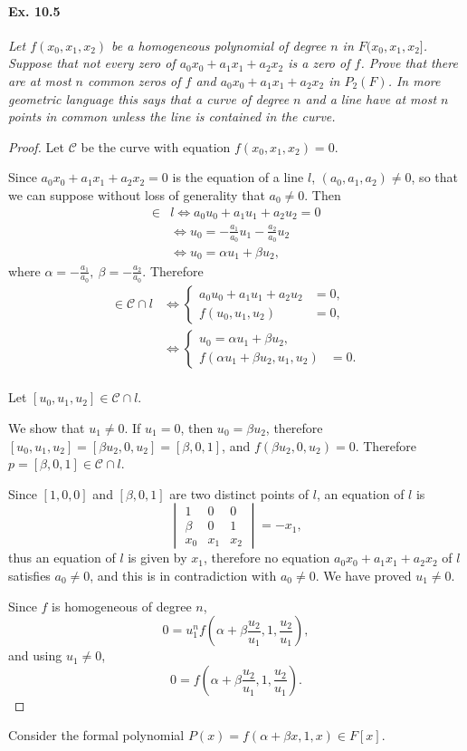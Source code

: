 \documentclass[11pt,a4paper]{article}
\begin{document}
\paragraph{Ex. 10.5} {\it Let $f(x_0,x_1,x_2)$ be a homogeneous polynomial of degree $n$ in $F(x_0,x_1,x_2]$. Suppose that not every zero of $a_0x_0+a_1x_1+a_2x_2$ is a zero of $f$. Prove that there are at most $n$ common zeros of $f$ and $a_0x_0+a_1x_1+a_2x_2$ in $P_2(F)$. In more geometric language this says that a curve of degree $n$ and a line have at most $n$ points in common unless the line is contained in the curve.
}
\begin{proof}
Let $\mathscr{C}$ be the curve with equation $f(x_0,x_1,x_2) = 0$.

Since $a_0 x_0+a_1x_1+a_2x_2 =0$ is the equation of a line $l$, $(a_0,a_1,a_2) \ne 0$, so that we can suppose without loss of generality that $a_0 \ne 0$. Then 
\begin{align*}
[u_0,u_1,u_2] \in &l \iff a_0 u_0+a_1u_1+a_2u_2 =0\\
& \iff u_0 = -\frac{a_1}{a_0} u_1 - \frac{a_2}{a_0} u_2\\
&\iff u_0 = \alpha u_1 + \beta u_2,
\end{align*}
where $\alpha = -\frac{a_1}{a_0},\ \beta = - \frac{a_2}{a_0}.$
Therefore
\begin{align*}
[u_0,u_1,u_2] \in \mathscr{C} \cap l &\iff 
\left\{
\begin{array}{ll}
  a_0 u_0+a_1u_1+a_2u_2 &=0,\\
  f(u_0,u_1,u_2) &= 0,
\end{array}
\right.\\
&\iff 
\left\{
\begin{array}{ll}
  u_0 = \alpha u_1+\beta u_2,\\
  f\left(\alpha u_1+ \beta u_2,u_1,u_2\right) &= 0.
\end{array}
\right.
\end{align*}\\
Let $[u_0,u_1,u_2] \in  \mathscr{C} \cap l $. 

We show that $u_1 \ne 0$. If $u_1 = 0$, then $u_0 = \beta u_2$, therefore $[u_0,u_1,u_2] = [\beta u_2, 0, u_2] = [\beta, 0 ,1]$, and $f\left (\beta u_2, 0,u_2\right) = 0$. Therefore $p = [\beta,0,1] \in \mathscr{C} \cap l$.

Since $[1,0,0]$ and $[\beta,0,1]$ are two distinct points of $l$, an equation of $l$ is
$$
\begin{vmatrix}
1 & 0 & 0\\
\beta & 0 & 1\\
x_0 & x_1 & x_2
\end{vmatrix}
= -x_1,
$$
thus an equation of $l$ is given by $x_1$, therefore no equation $a_0 x_0 + a_1 x_1 + a_2 x_2$ of $l$ satisfies $a_0 \ne 0$, and this is in contradiction with $a_0 \ne 0$. We have proved $u_1 \ne 0$.



Since $f$ is homogeneous of degree $n$,
$$0 = u_1^n f\left(\alpha + \beta \frac{u_2}{u_1},1,\frac{u_2}{u_1}\right),$$
and using $u_1 \ne 0$,
$$0 =  f\left(\alpha + \beta \frac{u_2}{u_1},1,\frac{u_2}{u_1}\right).$$
\end{proof}
Consider the formal polynomial $P(x) = f\left(\alpha + \beta x,1,x\right) \in F[x].$
\end{document}
